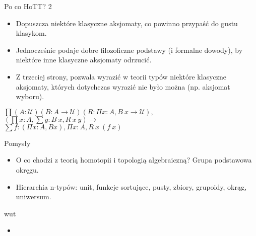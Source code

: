 \documentclass{beamer}
\begin{document}
\begin{frame}{Po co HoTT? 2}
\begin{itemize}
	\item Dopuszcza niektóre klasyczne aksjomaty, co powinno przypaść do gustu klasykom.
	\item Jednocześnie podaje dobre filozoficzne podstawy (i formalne dowody), by niektóre inne klasyczne aksjomaty odrzucić.
	\item Z trzeciej strony, pozwala wyrazić w teorii typów niektóre klasyczne aksjomaty, których dotychczas wyrazić nie było można (np. aksjomat wyboru).
\end{itemize}
\begin{theorem}
$\textstyle
	\prod (A : \mathcal{U}) (B : A \to \mathcal{U}) (R : \Pi x : A, B\ x \to \mathcal{U}),$ \\
		$(\prod x : A, \sum y : B\ x, R\ x\ y) \to$ \\
			$\sum f : (\Pi x : A, B x), \Pi x : A, R\ x\ (f\ x)$
\end{theorem}
\end{frame}


\begin{frame}{Pomysły}
\begin{itemize}
	\item O co chodzi z teorią homotopii i topologią algebraiczną? Grupa podstawowa okręgu.
	\item Hierarchia n-typów: unit, funkcje sortujące, pusty, zbiory, grupoidy, okrąg, uniwersum.
	
\end{itemize}
\end{frame}

\begin{frame}{wut}
\begin{itemize}
	\item
\end{itemize}
\end{frame}
\end{document}
